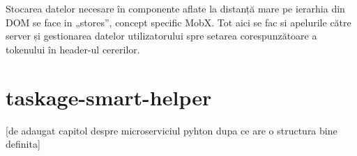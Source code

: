 Stocarea datelor necesare în componente aflate la distanță mare pe ierarhia din DOM se face in „stores”, concept specific MobX. Tot aici se fac si apelurile către server și gestionarea datelor utilizatorului spre setarea corespunzătoare a tokenului în header-ul cererilor.

\section{taskage-smart-helper}

[de adaugat capitol despre microserviciul pyhton dupa ce are o structura bine definita]